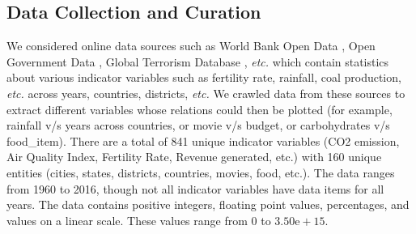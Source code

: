 \documentclass[10pt,twocolumn,letterpaper]{article}
\begin{document}
\subsection{Data Collection and Curation}

We considered online data sources such as World Bank Open Data%
, Open Government Data%
, Global Terrorism Database%
, \textit{etc.} which contain statistics about various indicator variables such as fertility rate, rainfall, coal production, \textit{etc.} across years, countries, districts, \textit{etc.} 
We crawled data from these sources to extract different variables whose relations could then be plotted (for example, rainfall v/s years across countries, or movie v/s budget, or carbohydrates v/s food\_item). 
There are a total of 841 unique indicator variables (CO2 emission, Air Quality Index, Fertility Rate, Revenue generated, etc.) with 160 unique entities (cities, states, districts, countries, movies, food, etc.).
The data ranges from 1960 to 2016, though not all indicator variables have data items for all years.
The data contains positive integers, floating point values, percentages, and values on a linear scale. These values range from $0$ to $3.50\mathrm{e+}15$. 

\end{document}
